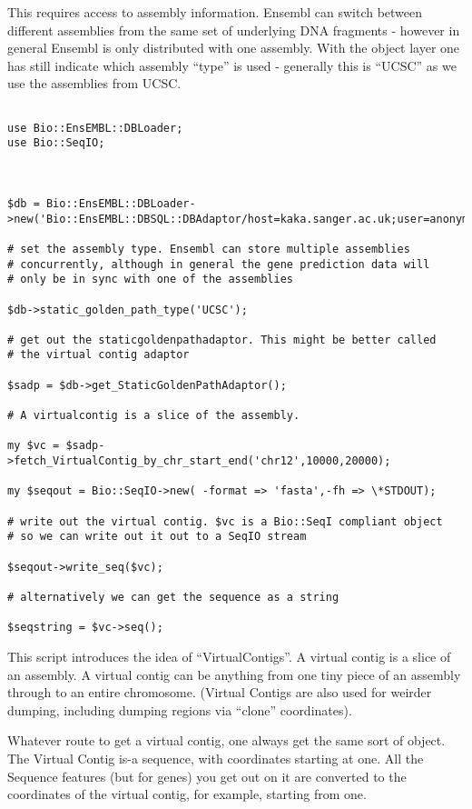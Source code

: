 \documentclass[11pt,a4paper]{article}
\begin{document}
This requires access to assembly information. Ensembl can switch
between different assemblies from the same set of underlying DNA
fragments - however in general Ensembl is only distributed with
one assembly. With the object layer one has still indicate which
assembly ``type'' is used - generally this is ``UCSC'' as we use
the assemblies from UCSC.


\begin{verbatim}

use Bio::EnsEMBL::DBLoader;
use Bio::SeqIO;



$db = Bio::EnsEMBL::DBLoader->new('Bio::EnsEMBL::DBSQL::DBAdaptor/host=kaka.sanger.ac.uk;user=anonymous;dbname=current');

# set the assembly type. Ensembl can store multiple assemblies
# concurrently, although in general the gene prediction data will
# only be in sync with one of the assemblies

$db->static_golden_path_type('UCSC');

# get out the staticgoldenpathadaptor. This might be better called
# the virtual contig adaptor

$sadp = $db->get_StaticGoldenPathAdaptor();

# A virtualcontig is a slice of the assembly.

my $vc = $sadp->fetch_VirtualContig_by_chr_start_end('chr12',10000,20000);

my $seqout = Bio::SeqIO->new( -format => 'fasta',-fh => \*STDOUT);

# write out the virtual contig. $vc is a Bio::SeqI compliant object
# so we can write out it out to a SeqIO stream

$seqout->write_seq($vc);

# alternatively we can get the sequence as a string

$seqstring = $vc->seq();

\end{verbatim}

This script introduces the idea of ``VirtualContigs''. A virtual contig is a
slice of an assembly. A virtual contig can be anything from one tiny piece
of an assembly through to an entire chromosome. (Virtual Contigs are also used
for weirder dumping, including dumping regions via ``clone'' coordinates).

Whatever route to get a virtual contig, one always get the same sort
of object.  The Virtual Contig is-a sequence, with coordinates
starting at one. All the Sequence features (but for genes) you get out
on it are converted to the coordinates of the virtual contig, for example,
starting from one. 
\end{document}
